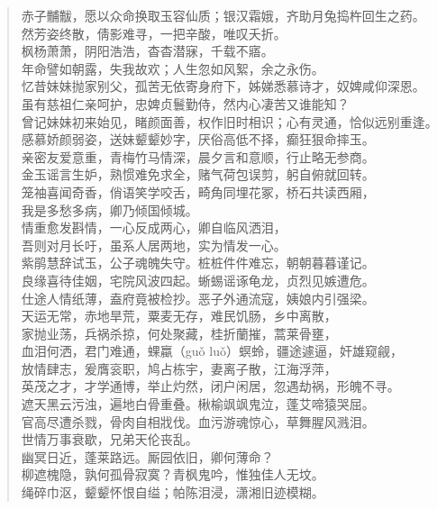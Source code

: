 \documentclass[12pt,oneside]{book}
\newenvironment{shici}{%
\begin{verse}%
\centering\large\hspace{12pt}}%
{\end{verse}}
\begin{document}
\begin{shici}
赤子黼黻，愿以众命换取玉容仙质；银汉霜娥，齐助月兔捣杵回生之药。\\
然芳姿终散，倩影难寻，一把辛酸，唯叹夭折。\\
枫杨萧萧，阴阳浩浩，杳杳潜寐，千载不寤。\\
年命譬如朝露，失我故欢；人生忽如风絮，余之永伤。\\
忆昔妹妹抛家别父，孤苦无依寄身府下，姊娣悉慕诗才，奴婢咸仰深恩。\\
虽有慈祖仁亲呵护，忠婢贞鬟勤侍，然内心凄苦又谁能知？\\
曾记妹妹初来始见，睹颜面善，权作旧时相识；心有灵通，恰似远别重逢。\\
感慕娇颜弱姿，送妹颦颦妙字，厌俗高低不择，癫狂狠命摔玉。\\
亲密友爱意重，青梅竹马情深，晨夕言和意顺，行止略无参商。\\
金玉谣言生妒，熟惯难免求全，赌气荷包误剪，躬自俯就回转。\\
笼袖喜闻奇香，俏语笑学咬舌，畸角同埋花冢，桥石共读西厢，\\
我是多愁多病，卿乃倾国倾城。\\
情重愈发斟情，一心反成两心，卿自临风洒泪，\\
吾则对月长吁，虽系人居两地，实为情发一心。\\
紫鹃慧辞试玉，公子魂魄失守。桩桩件件难忘，朝朝暮暮谨记。\\
良缘喜待佳姻，宅院风波四起。蜥蜴谣诼龟龙，贞烈见嫉遭危。\\
仕途人情纸薄，盍府竟被检抄。恶子外通流寇，姨娘内引强梁。\\
天运无常，赤地旱荒，粟麦无存，难民饥肠，乡中离散，\\
家抛业荡，兵祸杀掠，何处聚藏，桂折蘭摧，蒿莱骨壅，\\
血泪何洒，君门难通，蜾蠃（guǒ luǒ）螟蛉，疆途遽逼，奸雄窥觎，\\
放情肆志，爰膺衮职，鸠占栋宇，妻离子散，江海浮萍，\\
英茂之才，才学通博，举止灼然，闭户闲居，忽遇劫祸，形魄不寻。\\
遮天黑云污浊，遍地白骨重叠。楸榆飒飒鬼泣，蓬艾啼猿哭屈。\\
官高尽遭杀戮，骨肉自相戕伐。血污游魂惊心，草舞腥风溅泪。\\
世情万事衰歇，兄弟天伦丧乱。\\
幽冥日近，蓬莱路远。厮园依旧，卿何薄命？\\
柳遮槐隐，孰何孤骨寂寞？青枫鬼吟，惟独佳人无坟。\\
绳碎巾沤，颦颦怀恨自缢；帕陈泪浸，潇湘旧迹模糊。\\

\end{shici}
\end{document}
